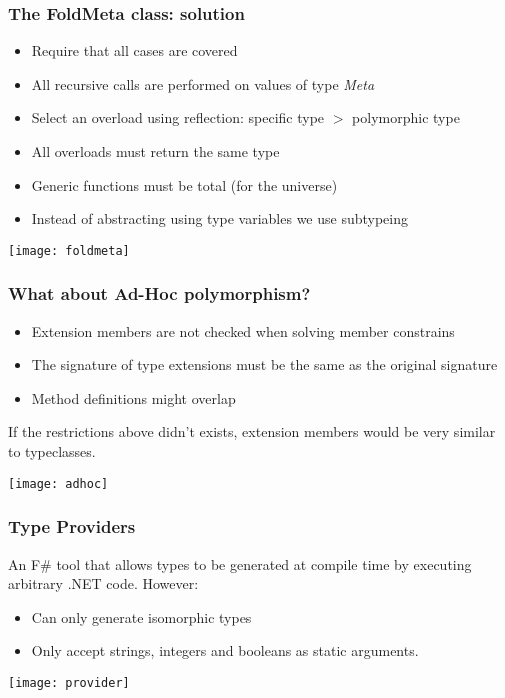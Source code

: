 \documentclass{beamer}
\begin{document}
\begin{frame}
  \frametitle{The FoldMeta class: solution}
  \begin{itemize}
  \item Require that all cases are covered
  \item All recursive calls are performed on values of type
    \emph{Meta}
  \item Select an overload using reflection: specific type $>$
    polymorphic type
  \item All overloads must return the same type
  \item Generic functions must be total (for the universe)
  \item Instead of abstracting using type variables we use subtypeing
  \end{itemize}
  \centering\texttt{[image: foldmeta]}
    
\end{frame}

\begin{frame}
  \frametitle{What about Ad-Hoc polymorphism?}
  \begin{itemize}
  \item Extension members are not checked when solving member
    constrains
  \item The signature of type extensions must be the same as the
    original signature
  \item Method definitions might overlap
  \end{itemize}
  If the restrictions above didn't exists, extension members would
  be very similar to typeclasses.

  \centering\texttt{[image: adhoc]}
  
\end{frame}

\begin{frame}

  \frametitle{Type Providers}

  An F\# tool that allows types to be generated at compile time by
  executing arbitrary .NET code. However:
  
  \begin{itemize}
  \item Can only generate isomorphic types
  \item Only accept strings, integers and booleans as static
    arguments.
    
  \end{itemize}

  \centering\texttt{[image: provider]}
  
\end{frame}
\end{document}
